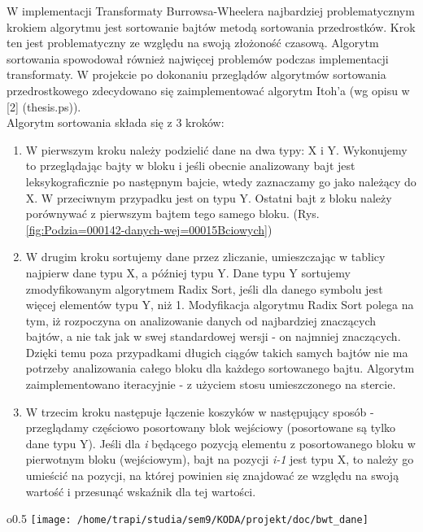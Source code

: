 \documentclass[a4paper,12pt]{article}
\begin{document}
W implementacji Transformaty Burrowsa-Wheelera najbardziej problematycznym
krokiem algorytmu jest sortowanie bajtów metodą sortowania przedrostków.
Krok ten jest problematyczny ze względu na swoją złożoność czasową.
Algorytm sortowania spowodował również najwięcej problemów podczas
implementacji transformaty. W projekcie po dokonaniu przeglądów algorytmów
sortowania przedrostkowego zdecydowano się zaimplementować algorytm
Itoh'a (wg opisu w {[}2{]} (thesis.ps)).\\
 Algorytm sortowania składa się z 3 kroków: 
\begin{enumerate}
\item W pierwszym kroku należy podzielić dane na dwa typy: X i Y. Wykonujemy
to przeglądając bajty w bloku i jeśli obecnie analizowany bajt jest
leksykograficznie po następnym bajcie, wtedy zaznaczamy go jako należący
do X. W przeciwnym przypadku jest on typu Y. Ostatni bajt z bloku
należy porównywać z pierwszym bajtem tego samego bloku. (Rys. \ref{fig:Podzia=000142-danych-wej=00015Bciowych})
\item W drugim kroku sortujemy dane przez zliczanie, umieszczając w tablicy
najpierw dane typu X, a później typu Y. Dane typu Y sortujemy zmodyfikowanym
algorytmem Radix Sort, jeśli dla danego symbolu jest więcej elementów
typu Y, niż 1. Modyfikacja algorytmu Radix Sort polega na tym, iż
rozpoczyna on analizowanie danych od najbardziej znaczących bajtów,
a nie tak jak w swej standardowej wersji - on najmniej znaczących.
Dzięki temu poza przypadkami długich ciągów takich samych bajtów nie
ma potrzeby analizowania całego bloku dla każdego sortowanego bajtu.
Algorytm zaimplementowano iteracyjnie - z użyciem stosu umieszczonego
na stercie. 
\item W trzecim kroku następuje łączenie koszyków w następujący sposób -
przeglądamy częściowo posortowany blok wejściowy (posortowane są tylko
dane typu Y). Jeśli dla \emph{i} będącego pozycją elementu z posortowanego
bloku w pierwotnym bloku (wejściowym), bajt na pozycji \emph{i-1}
jest typu X, to należy go umieścić na pozycji, na której powinien
się znajdować ze względu na swoją wartość i przesunąć wskaźnik dla
tej wartości. 
\end{enumerate}
\begin{wrapfigure}{o}{0.5\columnwidth}%
\texttt{[image: /home/trapi/studia/sem9/KODA/projekt/doc/bwt\_dane]}

\caption{\label{fig:Podzia=000142-danych-wej=00015Bciowych}Przykład - podział
danych wejściowych na typy}
\end{wrapfigure}%
\end{document}
